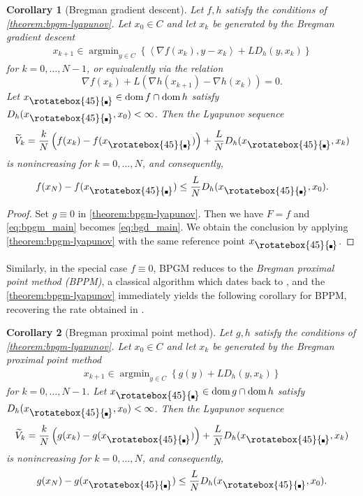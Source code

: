 \documentclass{article}
\theoremstyle{definition}
\theoremstyle{plain}
\newtheorem{corollary}{Corollary}
\DeclareMathOperator*{\argmin}{argmin}
\newcommand{\inprod}[2]{\left\langle #1,#2 \right\rangle}
\newcommand{\pr}[1]{\left( #1 \right)}
\newcommand{\compidx}{%
  \mathord{\mathchoice
    {\vcenter{\hbox{\rotatebox{45}{\rule{0.39em}{0.39em}}}}}
    {\vcenter{\hbox{\rotatebox{45}{\rule{0.39em}{0.39em}}}}}
    {\vcenter{\hbox{\rotatebox{45}{\rule{0.29em}{0.29em}}}}}
    {\vcenter{\hbox{\rotatebox{45}{\rule{0.23em}{0.23em}}}}}}%
}
\newcommand{\bregsm}{f}
\newcommand{\bregprox}{g}
\begin{document}
\begin{corollary}[Bregman gradient descent]
\label{corollary:bgd-rate}
Let $\bregsm,h$ satisfy the conditions of \cref{theorem:bpgm-lyapunov}.
Let $x_0 \in C$ and let $x_k$ be generated by the Bregman gradient descent
\begin{align}
\tag{BGD}\label{eq:bgd_main}
    x_{k+1}\in\argmin_{y\in C}
    \left\{
        \inprod{\nabla \bregsm(x_k)}{y-x_k}+L D_h(y,x_k)
    \right\}
\end{align}
for $k=0,\dots,N-1$, or equivalently via the relation
\[
    \nabla \bregsm(x_k)+L\pr{\nabla h(x_{k+1})-\nabla h(x_k)}=0.
\]
Let $x_{\compidx} \in \operatorname{dom}\bregsm\cap\operatorname{dom}h$ satisfy $D_h(x_{\compidx},x_0)<\infty$.
Then the Lyapunov sequence
\[
    \widetilde V_k=\frac{k}{N}\pr{\bregsm(x_k)-\bregsm(x_{\compidx})}+\frac{L}{N}D_h(x_{\compidx},x_k)
\]
is nonincreasing for $k=0,\dots,N$, and consequently,
\[
    \bregsm(x_N)-\bregsm(x_{\compidx})\le \frac{L}{N}D_h(x_{\compidx},x_0).
\]
\end{corollary}

\begin{proof}
    
Set $\bregprox\equiv0$ in \cref{theorem:bpgm-lyapunov}.
Then we have $F=\bregsm$ and \eqref{eq:bpgm_main} becomes \eqref{eq:bgd_main}.
We obtain the conclusion by applying \cref{theorem:bpgm-lyapunov} with the same reference point $x_{\compidx}$.
\end{proof}

Similarly, in the special case $\bregsm\equiv0$, BPGM reduces to the \textit{Bregman proximal point method (BPPM)}, a classical algorithm which dates back to \cite{CZ1992}, and the \cref{theorem:bpgm-lyapunov} immediately yields the following corollary for BPPM, recovering the rate obtained in \cite{AuslenderTeboulle2006_interior}.

\begin{corollary}[Bregman proximal point method]
\label{corollary:bppm-rate}
Let $\bregprox,h$ satisfy the conditions of \cref{theorem:bpgm-lyapunov}.
Let $x_0 \in C$ and let $x_k$ be generated by the Bregman proximal point method
\begin{align}
\tag{BPPM}\label{eq:bppm_main}
    x_{k+1}\in\argmin_{y\in C}
    \left\{
        \bregprox(y)+L D_h(y,x_k)
    \right\}
\end{align}
for $k=0,\dots,N-1$.
Let $x_{\compidx} \in \operatorname{dom}\bregprox\cap\operatorname{dom}h$ satisfy $D_h(x_{\compidx},x_0)<\infty$.
Then the Lyapunov sequence
\[
    \widetilde V_k=\frac{k}{N}\pr{\bregprox(x_k)-\bregprox(x_{\compidx})}+\frac{L}{N}D_h(x_{\compidx},x_k)
\]
is nonincreasing for $k=0,\dots,N$, and consequently,
\[
    \bregprox(x_N)-\bregprox(x_{\compidx})\le \frac{L}{N}D_h(x_{\compidx},x_0) .
\]
\end{corollary}
\end{document}

